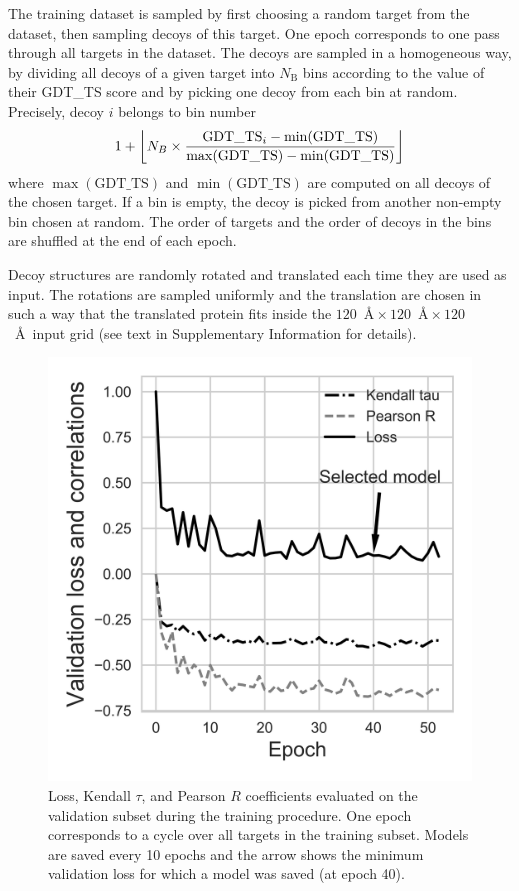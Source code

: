 \documentclass{bioinfo}
\DeclarePairedDelimiter\floor{\lfloor}{\rfloor}
\begin{document}
The training dataset is sampled by first choosing a random target from
the dataset, then sampling decoys of this target. One epoch
corresponds to one pass through all targets in the dataset. The decoys
are sampled in a homogeneous way, by dividing all decoys of a given
target into $N_\text{B}$ bins according to the value of their GDT\_TS score
and by picking one decoy from each bin at random.
Precisely, decoy $i$ belongs to bin number 
\begin{equation}
1 + \floor*{ N_B \times \frac{\text{GDT\_TS}_i - \min(\text{GDT\_TS}) }{\max(\text{GDT\_TS}) - \min(\text{GDT\_TS})} }
\end{equation}
where $\max(\text{GDT\_TS})$ and $\min(\text{GDT\_TS})$ are computed
on all decoys of the chosen target.  If a bin
is empty, the decoy is picked from another non-empty bin chosen at
random.  The order of targets and the order of decoys in the bins are
shuffled at the end of each epoch.

Decoy structures are randomly rotated and translated each time they
are used as input. The rotations are sampled uniformly
\citep{shoemake1992uniform} and the translation are chosen in such a
way that the translated protein fits inside the $120$~\AA${}\times
120$~\AA${}\times 120$~\AA\ input grid (see text in Supplementary
Information for details).

\begin{figure}[!tpb]
    \centerline{\includegraphics[width=0.7\linewidth]{image4.png}}
    \vspace{-15pt}
    \caption{Loss, Kendall $\tau$, and Pearson $R$ coefficients
      evaluated on the validation subset during the training
      procedure.  One epoch corresponds to a cycle over all targets in
      the training subset. Models are saved every 10 epochs and the
      arrow shows the minimum validation loss for which a model was
      saved (at epoch 40).}
    \label{Fig:TrainingLoss}
\end{figure}
\end{document}
